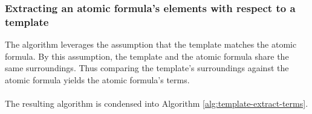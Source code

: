 \documentclass[../main.tex]{subfiles}
\begin{document}

\subsubsection{Extracting an atomic formula's elements with respect to a template}
The algorithm leverages the assumption that the template matches the atomic formula. By this assumption, the template and the atomic formula share the same surroundings. Thus comparing the template's surroundings against the atomic formula yields the atomic formula's terms. 
\\
\\
The resulting algorithm is condensed into Algorithm \ref{alg:template-extract-terms}.
\end{document}

